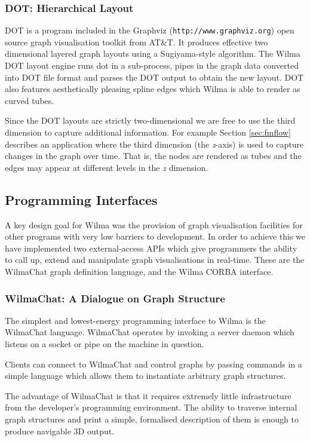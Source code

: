 \documentclass[runningheads]{cl2emult}
\newcommand{\url}[1]{{\small{\tt #1}}}
\begin{document}
\subsubsection{DOT: Hierarchical Layout}
DOT is a program included in the Graphviz
(\url{http://www.graphviz.org}) open source graph visualisation
toolkit from AT\&T.  It produces effective two dimensional layered graph
layouts using a Sugiyama\cite{Sugiyama81methods}-style algorithm.
The Wilma DOT layout engine runs dot in a sub-process, pipes in the graph
data converted into DOT file format and parses the DOT output to
obtain the new layout.
DOT also features aesthetically pleasing spline edges which Wilma
is able to render as curved tubes.

Since the DOT layouts are strictly two-dimensional we are free to use the
third dimension to capture additional information.  For example
Section \ref{sec:fmflow} describes an application where the third
dimension (the {\em z}-axis) is used to capture changes in the graph over time.
That is, the nodes are rendered as tubes and the edges may appear at different
levels in the {\em z} dimension.

\subsection{Programming Interfaces}
\label{API}

A key design goal for Wilma was the provision of graph visualisation
facilities for other programs with very low barriers to development.  In order
to achieve this we have implemented two external-access APIs which give
programmers the ability to call up, extend and manipulate graph visualisations
in real-time.  These are the WilmaChat graph definition language, and the
Wilma CORBA interface.

\subsubsection{WilmaChat: A Dialogue on Graph Structure}

The simplest and lowest-energy programming interface to Wilma is the WilmaChat
language.  WilmaChat operates by invoking a server daemon which listens on a
socket or pipe on the machine in question.

Clients can connect to WilmaChat and control graphs by passing commands
in a simple language which allows them to instantiate arbitrary graph
structures.

The advantage of WilmaChat is that it requires extremely little infrastructure
from the developer's programming environment.  The ability to traverse
internal graph structures and print a simple, formalised description of them
is enough to produce navigable 3D output.
\end{document}
